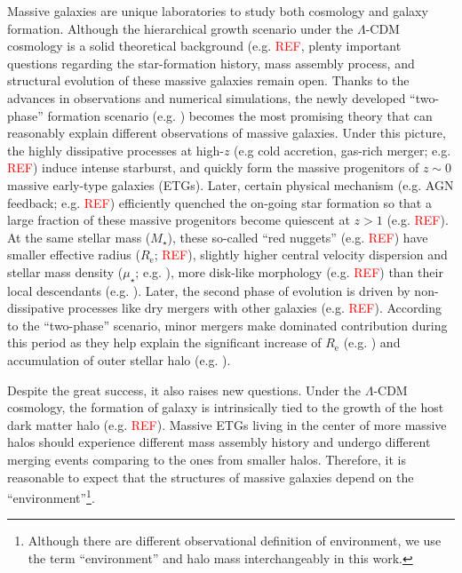 \documentclass{emulateapj}
\def\mstar{{$M_{\star}$}}
\def\mden{{$\mu_{\star}$}}
\newcommand{\addref}{{\textcolor{red}{REF}}}
\begin{document}
\begin{CJK*}{UTF8}{gbsn}
    Massive galaxies are unique laboratories to study both cosmology and galaxy 
    formation. 
    Although the hierarchical growth scenario under the $\Lambda$-CDM cosmology 
    is a solid theoretical background (e.g. \addref{}, plenty important questions 
    regarding the star-formation history, mass assembly process, and structural 
    evolution of these massive galaxies remain open. 
    Thanks to the advances in observations and numerical simulations, the newly 
    developed ``two-phase'' formation scenario (e.g. \citealt{Oser2010, Oser2012}) 
    becomes the most promising theory that can reasonably explain different 
    observations of massive galaxies. 
    Under this picture, the highly dissipative processes at high-$z$ (e.g cold 
    accretion, gas-rich merger; e.g. \addref{}) induce intense starburst, and 
    quickly form the massive progenitors of $z\sim 0$ massive early-type galaxies 
    (ETGs). 
    Later, certain physical mechanism (e.g. AGN feedback; e.g. \addref{}) 
    efficiently quenched the on-going star formation so that a large fraction of 
    these massive progenitors become quiescent at $z>1$ (e.g. \addref{}). 
    At the same stellar mass (\mstar{}), these so-called ``red nuggets'' 
    (e.g. \addref{}) have smaller effective radius ($R_{\mathrm{e}}$; \addref{}), 
    slightly higher central velocity dispersion and stellar mass density 
    (\mden{}; e.g. \citealt{vandeSande2011, Belli2014}), more disk-like morphology 
    (e.g. \addref{}) than their local descendants (e.g. \citealt{Bezanson2009,
    vanDokkum2010}). 
    Later, the second phase of evolution is driven by non-dissipative processes 
    like dry mergers with other galaxies (e.g. \addref{}). 
    According to the ``two-phase'' scenario, minor mergers make dominated 
    contribution during this period as they help explain the significant increase
    of $R_{\mathrm{e}}$ (e.g. \citealt{Newman2012, vdWel2014}) and accumulation of 
    outer stellar halo (e.g.  \citealt{Szomoru2012, Patel2013}).         
   
    Despite the great success, it also raises new questions. 
    Under the $\Lambda$-CDM cosmology, the formation of galaxy is intrinsically 
    tied to the growth of the host dark matter halo (e.g. \addref{}).
    Massive ETGs living in the center of more massive halos should experience 
    different mass assembly history and undergo different merging events comparing 
    to the ones from smaller halos. 
    Therefore, it is reasonable to expect that the structures of massive galaxies
    depend on the ``environment''\footnote{Although there are different 
    observational definition of environment, we use the term ``environment'' and 
    halo mass interchangeably in this work.}.
    

\end{CJK*}
\end{document}
